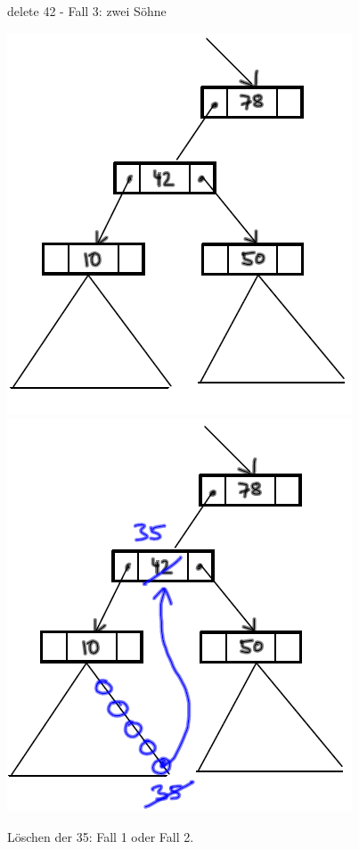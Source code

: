 \documentclass{beamer}
\begin{document}
\begin{frame}[fragile]
delete 42 - Fall 3: zwei Söhne  

\includegraphics[scale=0.6]{suchbaum12.png}  ~~~~~~ \pause 
\includegraphics[scale=0.6]{suchbaum13.png}   

Löschen der 35: Fall 1 oder Fall 2.

\end{frame}
\end{document}
